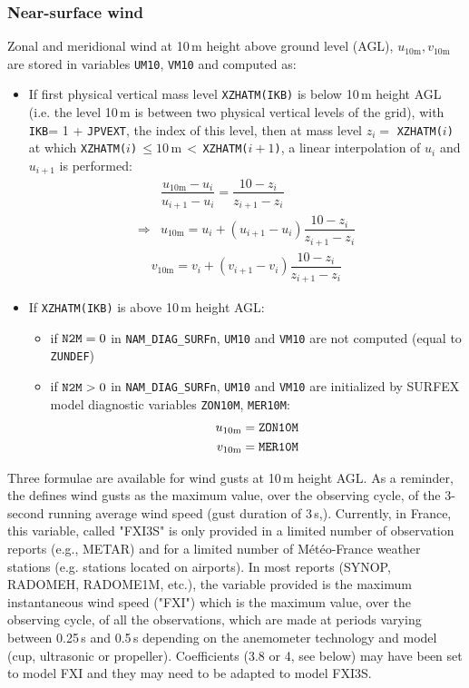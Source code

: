 \subsubsection{Near-surface wind}
%
Zonal and meridional wind at 10\,m height above ground level (AGL), $u_\mathrm{10m}, v_\mathrm{10m}$ are stored in variables {\tt UM10}, {\tt VM10} and computed as:
\begin{itemize}
\item If first physical vertical mass level {\tt XZHATM(IKB)} is below 10\,m height AGL (i.e. the level 10\,m is between two physical vertical levels of the grid), with {\tt IKB}= 1 + {\tt JPVEXT}, the index of this level, then at mass level $z_i =$ {\tt XZHATM($i$)} at which {\tt XZHATM($i$)}$\,\leq 10\,\mathrm{m}\,<\,${\tt XZHATM($i+1$)}, a linear interpolation of $u_i$ and $u_{i+1}$ is performed:
\begin{eqnarray}
&\dfrac{u_\mathrm{10m}-u_i}{u_{i+1}-u_i} = \dfrac{10-z_i}{z_{i+1}-z_i}\\
\Rightarrow &u_\mathrm{10m} =u_i + (u_{i+1}-u_i) \dfrac{10-z_i}{z_{i+1}-z_i}
\end{eqnarray}
\begin{eqnarray}
v_\mathrm{10m}=v_i + (v_{i+1}-v_i) \dfrac{10-z_i}{z_{i+1}-z_i}
\end{eqnarray}

\item If {\tt XZHATM(IKB)} is above 10\,m height AGL: 
\begin{itemize}
\item if ${\tt N2M} = 0$ in {\tt NAM\_DIAG\_SURFn}, {\tt UM10} and {\tt VM10} are not computed (equal to  {\tt ZUNDEF})
\item if ${\tt N2M} > 0$ in {\tt NAM\_DIAG\_SURFn}, {\tt UM10} and {\tt VM10} are initialized by SURFEX model diagnostic variables {\tt ZON10M}, {\tt MER10M}:
\begin{align}
u_\mathrm{10m} &= {\tt ZON10M} \label{U10SURF}\\
v_\mathrm{10m} &= {\tt MER10M} \label{V10SURF}
\end{align}
\end{itemize}
\end{itemize}

Three formulae are available for wind gusts at 10\,m height AGL. As a reminder, the \citet[WMO,][]{WMO2021} defines wind gusts as the maximum value, over the observing cycle, of the 3-second running average wind speed (gust duration of 3\,s,). Currently, in France, this variable, called "FXI3S" is only provided in a limited number of observation reports (e.g., METAR) and for a limited number of Météo-France weather stations (e.g. stations located on airports). In most reports (SYNOP, RADOMEH, RADOME1M, etc.), the variable provided is the maximum instantaneous wind speed ("FXI") which is the maximum value, over the observing cycle, of all the observations, which are made at periods varying between 0.25\,s and 0.5\,s depending on the anemometer technology and model (cup, ultrasonic or propeller). Coefficients (3.8 or 4, see below) may have been set to model FXI and they may need to be adapted to model FXI3S.

